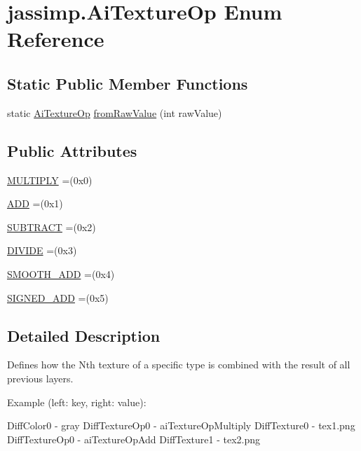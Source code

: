 \hypertarget{enumjassimp_1_1_ai_texture_op}{\section{jassimp.\+Ai\+Texture\+Op Enum Reference}
\label{enumjassimp_1_1_ai_texture_op}
}
\subsection*{Static Public Member Functions}
\begin{DoxyCompactItemize}
\item 
static \hyperlink{enumjassimp_1_1_ai_texture_op}{Ai\+Texture\+Op} \hyperlink{enumjassimp_1_1_ai_texture_op_ac7e1b1f129e6b22be05b52e1a748818f}{from\+Raw\+Value} (int raw\+Value)
\end{DoxyCompactItemize}
\subsection*{Public Attributes}
\begin{DoxyCompactItemize}
\item 
\hyperlink{enumjassimp_1_1_ai_texture_op_a451707cd7f58744be7e908fe394b491f}{M\+U\+L\+T\+I\+P\+L\+Y} =(0x0)
\item 
\hyperlink{enumjassimp_1_1_ai_texture_op_a471d0c16986820ceafbed7ea5b9761df}{A\+D\+D} =(0x1)
\item 
\hyperlink{enumjassimp_1_1_ai_texture_op_a52d5b44dc359cde628df12f6d1cdf686}{S\+U\+B\+T\+R\+A\+C\+T} =(0x2)
\item 
\hyperlink{enumjassimp_1_1_ai_texture_op_a016c114cb509acd1e5b837e9ae7b95f3}{D\+I\+V\+I\+D\+E} =(0x3)
\item 
\hyperlink{enumjassimp_1_1_ai_texture_op_a15b610c454cc3ee037588cd435cbcbf4}{S\+M\+O\+O\+T\+H\+\_\+\+A\+D\+D} =(0x4)
\item 
\hyperlink{enumjassimp_1_1_ai_texture_op_adc2d6b04f7a93e5c23cc7cd240cc9ecb}{S\+I\+G\+N\+E\+D\+\_\+\+A\+D\+D} =(0x5)
\end{DoxyCompactItemize}


\subsection{Detailed Description}
Defines how the Nth texture of a specific type is combined with the result of all previous layers.

Example (left\+: key, right\+: value)\+: ~\newline
 {\ttfamily 
\begin{DoxyPre}
 DiffColor0     - gray
 DiffTextureOp0 - aiTextureOpMultiply
 DiffTexture0   - tex1.png
 DiffTextureOp0 - aiTextureOpAdd
 DiffTexture1   - tex2.png
\end{DoxyPre}
}

